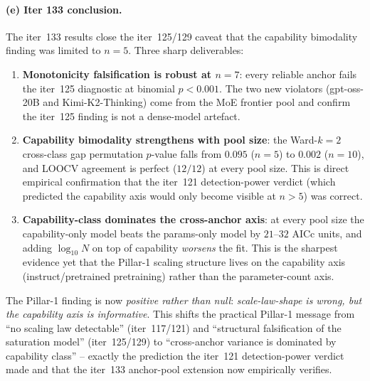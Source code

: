 \paragraph{(e) Iter 133 conclusion.}
\label{par:scaling-iter133-conclusion}
The iter~133 results close the iter~125/129 caveat that the
capability bimodality finding was limited to $n = 5$.  Three
sharp deliverables:

\begin{enumerate}
  \item \textbf{Monotonicity falsification is robust at
    $n = 7$}: every reliable anchor fails the iter~125
    diagnostic at binomial $p < 0.001$.  The two new violators
    (gpt-oss-20B and Kimi-K2-Thinking) come from the MoE
    frontier pool and confirm the iter~125 finding is not
    a dense-model artefact.
  \item \textbf{Capability bimodality strengthens with pool
    size}: the Ward-$k=2$ cross-class gap permutation
    $p$-value falls from $0.095$ ($n = 5$) to $0.002$
    ($n = 10$), and LOOCV agreement is perfect ($12/12$) at
    every pool size.  This is direct empirical confirmation
    that the iter~121 detection-power verdict (which predicted
    the capability axis would only become visible at $n > 5$)
    was correct.
  \item \textbf{Capability-class dominates the cross-anchor
    axis}: at every pool size the capability-only model beats
    the params-only model by $21$--$32$ AICc units, and
    adding $\log_{10} N$ on top of capability \emph{worsens}
    the fit.  This is the sharpest evidence yet that the
    Pillar-1 scaling structure lives on the capability axis
    (instruct/pretrained pretraining) rather than the
    parameter-count axis.
\end{enumerate}

The Pillar-1 finding is now \emph{positive rather than null}:
\emph{scale-law-shape is wrong, but the capability axis is
informative}.  This shifts the practical Pillar-1 message from
``no scaling law detectable'' (iter~117/121) and ``structural
falsification of the saturation model'' (iter~125/129) to
``cross-anchor variance is dominated by capability class'' --
exactly the prediction the iter~121 detection-power verdict
made and that the iter~133 anchor-pool extension now
empirically verifies.

